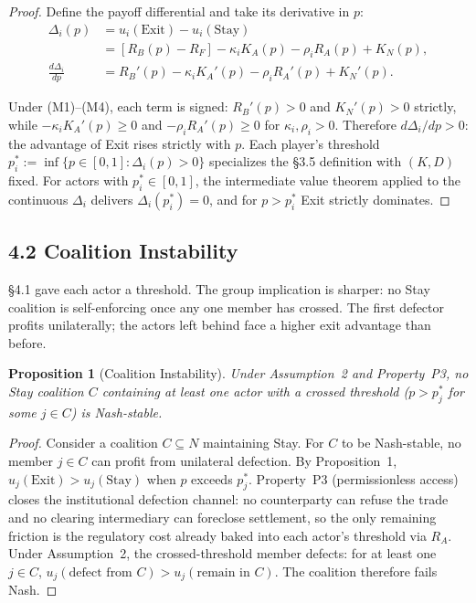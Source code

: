 \documentclass[12pt]{article}
\newtheorem{proposition}{Proposition}
\theoremstyle{definition}
\theoremstyle{remark}
\begin{document}
\begin{proof}
Define the payoff differential and take its derivative in $p$:
\begin{align*}
\Delta_i(p) &= u_i(\text{Exit}) - u_i(\text{Stay}) \\
            &= [R_B(p) - R_F] - \kappa_i K_A(p) - \rho_i R_A(p) + K_N(p), \\
\frac{d\Delta_i}{dp} &= R_B'(p) - \kappa_i K_A'(p) - \rho_i R_A'(p) + K_N'(p).
\end{align*}

Under (M1)--(M4), each term is signed: $R_B'(p) > 0$ and $K_N'(p) > 0$ strictly, while $-\kappa_i K_A'(p) \geq 0$ and $-\rho_i R_A'(p) \geq 0$ for $\kappa_i, \rho_i > 0$. Therefore $d\Delta_i/dp > 0$: the advantage of Exit rises strictly with $p$. Each player's threshold $p_i^* := \inf\{p \in [0, 1] : \Delta_i(p) > 0\}$ specializes the \S3.5 definition with $(K, D)$ fixed. For actors with $p_i^* \in [0, 1]$, the intermediate value theorem applied to the continuous $\Delta_i$ delivers $\Delta_i(p_i^*) = 0$, and for $p > p_i^*$ Exit strictly dominates.

\end{proof}

\subsection{4.2 Coalition Instability}

\S4.1 gave each actor a threshold. The group implication is sharper: no Stay coalition is self-enforcing once any one member has crossed. The first defector profits unilaterally; the actors left behind face a higher exit advantage than before.

\begin{proposition}[Coalition Instability]
Under Assumption~2 and Property~P3, no Stay coalition $C$
containing at least one actor with a crossed threshold
($p > p_j^*$ for some $j \in C$) is Nash-stable.
\end{proposition}

\begin{proof}
Consider a coalition $C \subseteq N$ maintaining Stay. For $C$ to be Nash-stable, no member $j \in C$ can profit from unilateral defection. By Proposition~1, $u_j(\text{Exit}) > u_j(\text{Stay})$ when $p$ exceeds $p_j^*$. Property~P3 (permissionless access) closes the institutional defection channel: no counterparty can refuse the trade and no clearing intermediary can foreclose settlement, so the only remaining friction is the regulatory cost already baked into each actor's threshold via $R_A$. Under Assumption~2, the crossed-threshold member defects: for at least one $j \in C$, $u_j(\text{defect from } C) > u_j(\text{remain in } C)$. The coalition therefore fails Nash.
\end{proof}
\end{document}

